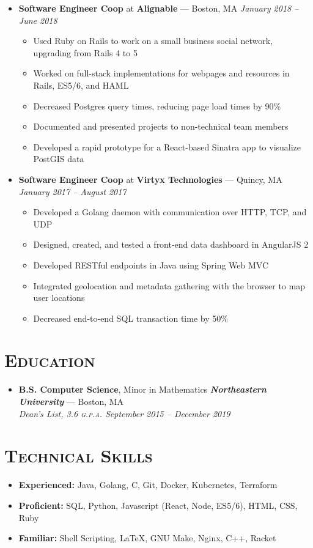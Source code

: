\documentclass{article}
\begin{document}
\begin{itemize}[label={},leftmargin=*]
  \item \textbf{Software Engineer Coop} at \textbf{Alignable} --- Boston, MA \hfill {\em January 2018 -- June 2018}
  \begin{itemize}[label={$\bullet$}]
    \item Used Ruby on Rails to work on a small business social network, upgrading from Rails 4 to 5
    \item Worked on full-stack implementations for webpages and resources in Rails, ES5/6, and HAML
    \item Decreased Postgres query times, reducing page load times by 90\%
    \item Documented and presented projects to non-technical team members
    \item Developed a rapid prototype for a React-based Sinatra app to visualize PostGIS data
  \end{itemize}

  \item \textbf{Software Engineer Coop} at \textbf{Virtyx Technologies} --- Quincy, MA \hfill {\em January 2017 -- August 2017}
  \begin{itemize}[label={$\bullet$}]
    \item Developed a Golang daemon with communication over HTTP, TCP, and UDP
    \item Designed, created, and tested a front-end data dashboard in AngularJS 2
    \item Developed RESTful endpoints in Java using Spring Web MVC
    \item Integrated geolocation and metadata gathering with the browser to map user locations
    \item Decreased end-to-end SQL transaction time by 50\%
  \end{itemize}
\end{itemize}

\section*{\textsc{Education}}
\begin{itemize}[label={},leftmargin=*]
  \item \textbf{B.S. Computer Science}, Minor in Mathematics \hfill \textit{\textbf{Northeastern University}} --- Boston, MA \\
  \em{Dean's List}, 3.6 \textsc{g.p.a.}  \hfill \em{\textit{September 2015 -- December 2019}}
\end{itemize}

\section*{\textsc{Technical Skills}}
\begin{itemize}[label={},leftmargin=*]
  \item \textbf{Experienced:} Java, Golang, C, Git, Docker, Kubernetes, Terraform
  \item \textbf{Proficient:} SQL, Python, Javascript (React, Node, ES5/6), HTML, CSS, Ruby
  \item \textbf{Familiar:} Shell Scripting, LaTeX, GNU Make, Nginx, C++, Racket
\end{itemize}
\end{document}
